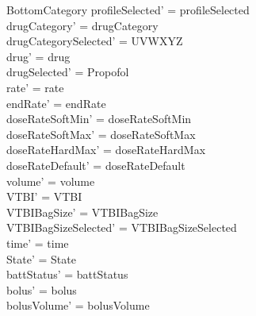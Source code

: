 \begin{schema}{BottomCategory}
	profileSelected' = profileSelected\\
	drugCategory' = drugCategory\\ 
	drugCategorySelected' = UVWXYZ\\
	drug' = drug\\ 
	drugSelected' = Propofol\\
	 \pagebreak
	rate' = rate\\
	endRate' = endRate\\
	doseRateSoftMin' = doseRateSoftMin\\
	doseRateSoftMax' = doseRateSoftMax\\
	doseRateHardMax' = doseRateHardMax\\
	doseRateDefault' = doseRateDefault\\
	volume' = volume\\
	VTBI' = VTBI\\
	VTBIBagSize' = VTBIBagSize\\ VTBIBagSizeSelected' = VTBIBagSizeSelected\\
	time' = time\\ State' = State\\
	battStatus' = battStatus\\
	bolus' = bolus\\
	bolusVolume' = bolusVolume\\

\end{schema}
